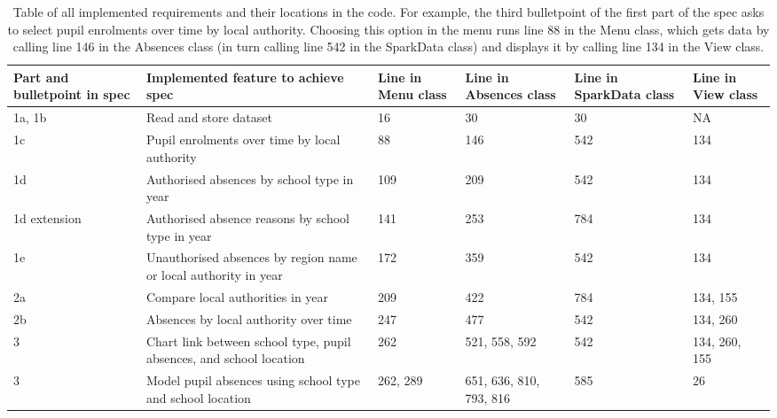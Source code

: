\documentclass{article}
\begin{document}
\begin{table}[htbp]
    \centering
    \begin{tabularx}{\textwidth}{|X|X|X|X|X|X|}
        \hline
        \textbf{Part and bulletpoint in spec} & \textbf{Implemented feature to achieve spec} & \textbf{Line in Menu class} & \textbf{Line in Absences class} & \textbf{Line in SparkData class} & \textbf{Line in View class} \\  

        \hline
        \hline
        1a, 1b & Read and store dataset & 16 & 30 & 30 & NA \\
        \hline
        1c & Pupil enrolments over time by local authority & 88 & 146 & 542 &  134 \\
        \hline
        1d & Authorised absences by school type in year & 109 & 209 & 542 & 134 \\
        \hline
        1d extension & Authorised absence reasons by school type in year & 141 & 253 & 784 & 134 \\
        \hline
        1e & Unauthorised absences by region name or local authority in year & 172 & 359 & 542 & 134 \\

        \hline
        \hline
        2a & Compare local authorities in year & 209 & 422 & 784 & 134, 155 \\
        \hline
        2b & Absences by local authority over time & 247 & 477 & 542 & 134, 260 \\

        \hline
        \hline
        3 & Chart link between school type, pupil absences, and school location & 262 & 521, 558, 592 & 542 & 134, 260, 155 \\
        \hline
        3 & Model pupil absences using school type and school location & 262, 289 & 651, 636, 810, 793, 816 & 585 & 26 \\
        \hline
        \hline

    \end{tabularx}

    \caption{Table of all implemented requirements and their locations in the code. For example, the third bulletpoint of the first part of the spec asks to select pupil enrolments over time by local authority. Choosing this option in the menu runs line 88 in the Menu class, which gets data by calling line 146 in the Absences class (in turn calling line 542 in the SparkData class) and displays it by calling line 134 in the View class.}
    \label{tab:requirements}

\end{table}
\end{document}
